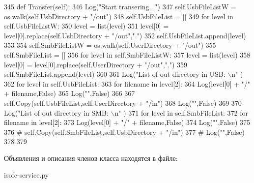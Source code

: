 \begin{DoxyCode}
345     \textcolor{keyword}{def }Transfer(self):
346         Log(\textcolor{stringliteral}{"Start transering..."})
347         self.UsbFileListW = os.walk(self.UsbDirectory + \textcolor{stringliteral}{"/out"})
348         self.UsbFileList = []
349         \textcolor{keywordflow}{for} level \textcolor{keywordflow}{in} self.UsbFileListW:
350             level = list(level)
351             level[0] = level[0].replace(self.UsbDirectory + \textcolor{stringliteral}{"/out"},\textcolor{stringliteral}{"."})
352             self.UsbFileList.append(level)
353 
354         self.SmbFileListW = os.walk(self.UserDirectory + \textcolor{stringliteral}{"/out"})
355         self.SmbFileList = []
356         \textcolor{keywordflow}{for} level \textcolor{keywordflow}{in} self.SmbFileListW:
357             level = list(level)
358             level[0] = level[0].replace(self.UserDirectory + \textcolor{stringliteral}{"/out"},\textcolor{stringliteral}{"."})
359             self.SmbFileList.append(level)
360 
361         Log(\textcolor{stringliteral}{"List of out directory in USB: \(\backslash\)n"} )
362         \textcolor{keywordflow}{for} level \textcolor{keywordflow}{in} self.UsbFileList:
363             \textcolor{keywordflow}{for} filename \textcolor{keywordflow}{in} level[2]:
364                 Log(level[0] + \textcolor{stringliteral}{"/"} + filename,\textcolor{keyword}{False})
365         Log(\textcolor{stringliteral}{""},\textcolor{keyword}{False})
366 
367         self.Copy(self.UsbFileList,self.UserDirectory + \textcolor{stringliteral}{"/in"})
368         Log(\textcolor{stringliteral}{""},\textcolor{keyword}{False})
369 
370         Log(\textcolor{stringliteral}{"List of out directory in SMB: \(\backslash\)n"} )
371         \textcolor{keywordflow}{for} level \textcolor{keywordflow}{in} self.SmbFileList:
372             \textcolor{keywordflow}{for} filename \textcolor{keywordflow}{in} level[2]:
373                 Log(level[0] + \textcolor{stringliteral}{"/"} + filename,\textcolor{keyword}{False})
374         Log(\textcolor{stringliteral}{""},\textcolor{keyword}{False})
375 
376 \textcolor{comment}{#        self.Copy(self.SmbFileList,self.UsbDirectory + "/in")}
377 \textcolor{comment}{#        Log("",False)}
378 
379 
\end{DoxyCode}


Объявления и описания членов класса находятся в файле\+:\begin{DoxyCompactItemize}
\item 
isofc-\/service.\+py\end{DoxyCompactItemize}
